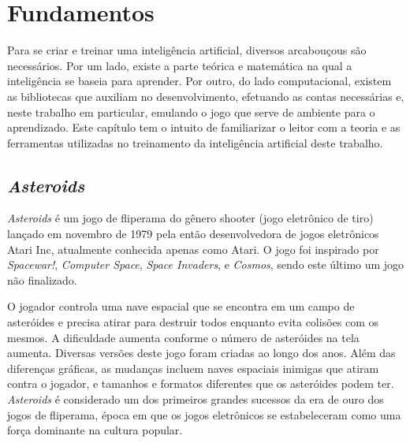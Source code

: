 \chapter{Fundamentos}
\label{cap:fundamentos}

Para se criar e treinar uma inteligência artificial, diversos arcabouçous são necessários. Por um lado, existe a parte teórica e matemática na qual a inteligência se baseia para aprender. Por outro, do lado computacional, existem as bibliotecas que auxiliam no desenvolvimento, efetuando as contas necessárias e, neste trabalho em particular, emulando o jogo que serve de ambiente para o aprendizado.
Este capítulo tem o intuito de familiarizar o leitor com a teoria e as ferramentas utilizadas no treinamento da inteligência artificial deste trabalho.

\section{\textit{Asteroids}}
\label{sec:asteroids}

\textit{Asteroids} é um jogo de fliperama do gênero shooter (jogo eletrônico de tiro) lançado em novembro de 1979 pela então desenvolvedora de jogos eletrônicos Atari Inc, atualmente conhecida apenas como Atari. O jogo foi inspirado por \textit{Spacewar!}, \textit{Computer Space}, \textit{Space Invaders}, e \textit{Cosmos}, sendo este último um jogo não finalizado.

O jogador controla uma nave espacial que se encontra em um campo de asteróides e precisa atirar para destruir todos enquanto evita colisões com os mesmos. A dificuldade aumenta conforme o número de asteróides na tela aumenta.
Diversas versões deste jogo foram criadas ao longo dos anos. Além das diferenças gráficas, as mudanças incluem naves espaciais inimigas que atiram contra o jogador, e tamanhos e formatos diferentes que os asteróides podem ter.
\textit{Asteroids} é considerado um dos primeiros grandes sucessos da era de ouro dos jogos de fliperama, época em que os jogos eletrônicos se estabeleceram como uma força dominante na cultura popular. 

